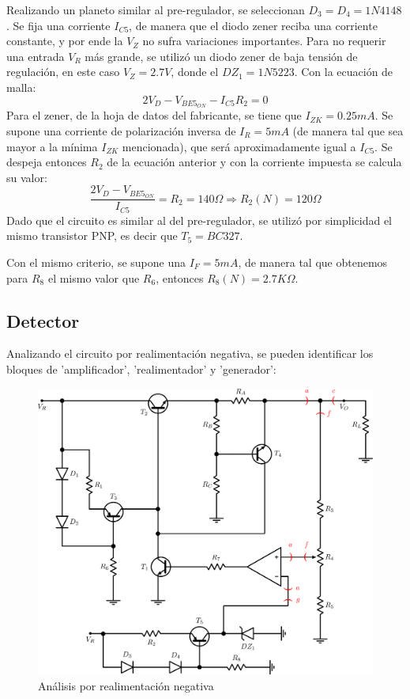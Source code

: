 Realizando un planeto similar al pre-regulador, se seleccionan $D_3 = D_4 = 1N4148$. Se fija una corriente $I_{C5}$, de manera que el diodo zener reciba una corriente constante, y por ende la $V_Z$ no sufra variaciones importantes. Para no requerir una entrada $V_R$ m\'as grande, se utiliz\'o un diodo zener de baja tensi\'on de regulaci\'on, en este caso $V_Z = 2.7V$, donde el $DZ_1 = 1N5223$. Con la ecuaci\'on de malla:
\[
2V_D - V_{BE5_{ON}} - I_{C5}R_2 = 0
\]
Para el zener, de la hoja de datos del fabricante, se tiene que $I_{ZK} = 0.25mA$. Se supone una corriente de polarizaci\'on inversa de $I_R = 5mA$ (de manera tal que sea mayor a la m\'inima $I_{ZK}$ mencionada), que ser\'a aproximadamente igual a $I_{C5}$. Se despeja entonces $R_2$ de la ecuaci\'on anterior y con la corriente impuesta se calcula su valor:
\[
\frac{2V_D - V_{BE5_{ON}}}{I_{C5}} = R_2 = 140\Omega \Longrightarrow R_2(N) = 120\Omega
\]
Dado que el circuito es similar al del pre-regulador, se utiliz\'o por simplicidad el mismo transistor PNP, es decir que $T_5 = BC327$.

Con el mismo criterio, se supone una $I_F = 5mA$, de manera tal que obtenemos para $R_8$ el mismo valor que $R_6$, entonces $R_8(N) = 2.7K\Omega$.

\newpage

\subsection{Detector}

Analizando el circuito por realimentaci\'on negativa, se pueden identificar los bloques de 'amplificador', 'realimentador' y 'generador':

\begin{figure}[!ht]
\begin{centering}
\includegraphics[scale=0.32]{Imagenes/CircuitoConFeed.png}
\par\end{centering}
\caption{An\'alisis por realimentaci\'on negativa}

\end{figure}

